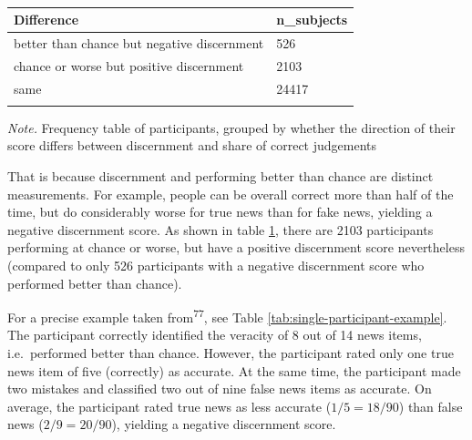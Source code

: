 \documentclass[
  doc,floatsintext]{apa6}
\begin{document}
\begin{table}[tbp]

\begin{center}
\begin{threeparttable}

\caption{\label{tab:compare-individual-measures}}

\begin{tabular}{ll}
\toprule
Difference & \multicolumn{1}{c}{n\_subjects}\\
\midrule
better than chance but negative discernment & 526\\
chance or worse but positive discernment & 2103\\
same & 24417\\
\bottomrule
\addlinespace
\end{tabular}

\begin{tablenotes}[para]
\normalsize{\textit{Note.} Frequency table of participants, grouped by whether the direction of their score differs between discernment and share of correct judgements}
\end{tablenotes}

\end{threeparttable}
\end{center}

\end{table}

That is because discernment and performing better than chance are distinct measurements. For example, people can be overall correct more than half of the time, but do considerably worse for true news than for fake news, yielding a negative discernment score. As shown in table \ref{tab:compare-individual-measures}, there are 2103 participants performing at chance or worse, but have a positive discernment score nevertheless (compared to only 526 participants with a negative discernment score who performed better than chance).

For a precise example taken from\textsuperscript{77}, see Table \ref{tab:single-participant-example}. The participant correctly identified the veracity of 8 out of 14 news items, i.e.~performed better than chance. However, the participant rated only one true news item of five (correctly) as accurate. At the same time, the participant made two mistakes and classified two out of nine false news items as accurate. On average, the participant rated true news as less accurate (\(1/5 = 18/90\)) than false news (\(2/9 = 20/90\)), yielding a negative discernment score.
\end{document}
